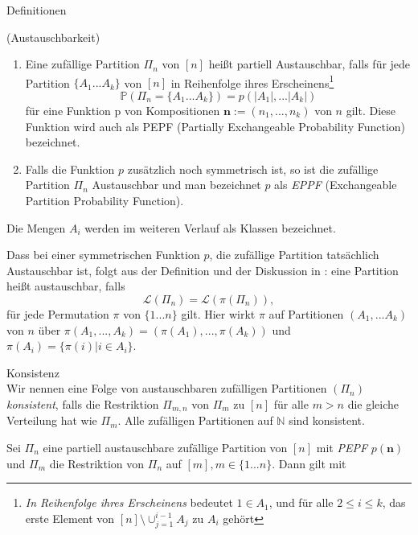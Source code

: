 \begin{section}{Definitionen}
\begin{Definition}
\end{Definition}
\begin{Definition}
    \textnormal{(Austauschbarkeit)}
    \label{Austauschbarkeit}
    \begin{enumerate}
        \item Eine zufällige Partition $\Pi_n$ von $[n]$ heißt partiell Austauschbar, falls für jede Partition $\{ A_1 ... A_k\}$ von $[n]$ in Reihenfolge ihres Erscheinens\footnote{\textit{In Reihenfolge ihres Erscheinens} bedeutet $1 \in A_1$, und für alle $2 \leq i \leq k$, das erste Element von $[n]\setminus \cup_{j=1}^{i-1}A_j$ zu $A_i$ gehört}
        \[ 
            \mathbb{P}(\Pi_n = \{ A_1 ... A_k\}) = p(|A_1|, ... |A_k|)
        \]  
        für eine Funktion p von Kompositionen $\textbf{n}:= (n_1, ..., n_k)$ von $n$ gilt. Diese Funktion wird auch als PEPF (Partially Exchangeable Probability Function) bezeichnet.
        \item Falls die Funktion $p$ zusätzlich noch symmetrisch ist, so ist die zufällige Partition $\Pi_n$ Austauschbar und man bezeichnet $p$ als \textit{EPPF} (Exchangeable Partition Probability Function).
    \end{enumerate}
    Die Mengen $A_i$ werden im weiteren Verlauf als Klassen bezeichnet.
\end{Definition}
\begin{Bemerkung}
    Dass bei einer symmetrischen Funktion $p$, die zufällige Partition tatsächlich Austauschbar ist, folgt aus der Definition und der Diskussion in \cite[Seite 85]{aldous2006ecole}: eine Partition heißt austauschbar, falls 
    \[
         \mathcal{L}(\Pi_n) = \mathcal{L}(\pi(\Pi_{n})),
    \]
    für jede Permutation $\pi$ von $\{1...n\}$ gilt. Hier wirkt $\pi$ auf Partitionen $(A_1,...A_k)$ von $n$ über $\pi(A_1,...,A_k) =(\pi(A_1),...,\pi(A_k)) $ und $\pi(A_i) = \{\pi(i) | i \in A_i\}$.
\end{Bemerkung}
\begin{Definition}{Konsistenz}\\
    Wir nennen eine Folge von austauschbaren zufälligen Partitionen $(\Pi_n)$ \textit{konsistent}, falls die Restriktion $\Pi_{m,n}$ von $\Pi_m$ zu $[n]$ für alle $m > n$ die gleiche Verteilung hat wie $\Pi_m$. Alle zufälligen Partitionen auf $\mathbb{N}$ sind konsistent.
\end{Definition}
\begin{lemma}
    \label{lemma partielle austauschbarkeit}
    Sei $\Pi_n$ eine partiell austauschbare zufällige Partition von $[n]$ mit \textit{PEPF} $p(\textbf{n})$ und $\Pi_m$ die Restriktion von $\Pi_n$ auf $[m], m \in \{1...n\}$. Dann gilt mit 

\end{lemma}
\end{section}
